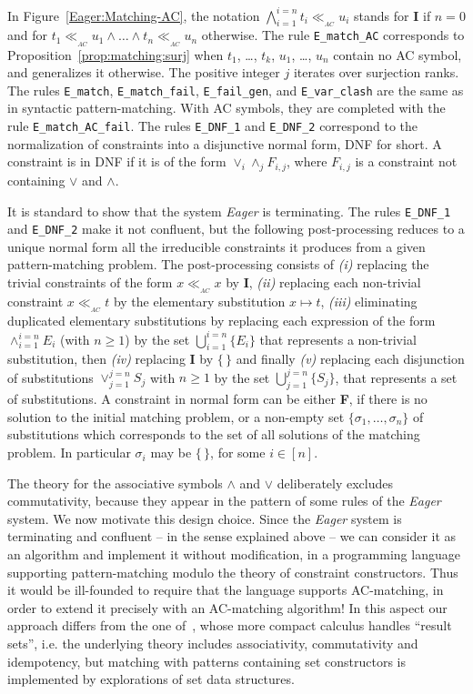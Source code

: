 \documentclass[submission,copyright,creativecommons]{eptcs}
\newcommand \matchth[3]{#1 {\ll}_{{ }_{#3}} {#2}}
\newcommand \matchAC[2]{\matchth{#1}{#2}{AC}}
\newcommand \set[1]{\{#1\}}
\numberwithin{subcase}{case}
\begin{document}
In Figure~\ref{Eager:Matching-AC}, the notation $\bigwedge_{i=1}^{i=n}
\matchAC{t_i}{u_i}$ stands for \textbf{I} if $n = 0$ and for $\matchAC{t_1}{u_1}
\land \ldots \land \matchAC{t_n}{u_n}$ otherwise. The rule \texttt{E\_match\_AC}
corresponds to Proposition~\ref{prop:matching:surj} when $t_1$, \ldots, $t_k$,
$u_1$, \ldots, $u_n$ contain no AC symbol, and generalizes it otherwise.  The
positive integer $j$ iterates over surjection ranks. The rules \texttt{E\_match},
\texttt{E\_match\_fail}, \texttt{E\_fail\_gen}, and \texttt{E\_var\_clash} are
the same as in syntactic pattern-matching. With AC symbols, they are completed
with the rule \texttt{E\_match\_AC\_fail}. The rules \texttt{E\_DNF\_1} and
\texttt{E\_DNF\_2} correspond to the normalization of constraints into a
disjunctive normal form, DNF for short. A constraint is in DNF if it is of
the form $\lor_{i}\land_j F_{i,j}$, where $F_{i,j}$ is a constraint not
containing $\lor$ and $\land$.


It is standard to show that the system \textit{Eager} is terminating. The rules
\texttt{E\_DNF\_1} and \texttt{E\_DNF\_2} make it not confluent, but the
following post-processing reduces to a unique normal form all the irreducible
constraints it produces from a given pattern-matching problem. The
post-processing consists of \emph{(i)} replacing the trivial constraints of the
form $\matchAC{x}{x}$ by \textbf{I}, \emph{(ii)} replacing each non-trivial
constraint $\matchAC{x}{t}$ by the elementary substitution
 $x\mapsto t$, \emph{(iii)} eliminating duplicated elementary substitutions by
 replacing each expression of the form $\land_{i=1}^{i=n} E_i$ (with $n \ge 1$)
 by the set $\bigcup_{i=1}^{i=n} \{E_i\}$ that represents a
non-trivial substitution, then \emph{(iv)} replacing $\textbf{I}$ by $\{\,\}$
and finally \emph{(v)} replacing each disjunction  of
substitutions $\lor_{j=1}^{j=n} S_j$ with $n \ge 1$ by the set
$\bigcup_{j=1}^{j=n} \{S_j\}$, that represents a set of substitutions. A constraint in normal form can be either
\textbf{F}, if there is no solution to the initial matching problem, or a
non-empty set $\set{\sigma_1,\ldots,\sigma_n}$ of substitutions  which
corresponds to the set of all solutions of the matching problem. In particular
$\sigma_i$ may be $\{\,\}$, for some $i\in [n]$.


The theory for the associative symbols $\land$ and $\lor$ deliberately excludes
commutativity, because they appear in the pattern of some rules of the
\textit{Eager} system. We now motivate  this design choice. 
Since the \textit{Eager} system  is terminating and confluent 
-- in the sense explained above -- we can consider
it  as an algorithm and implement it without
modification, in a programming language supporting pattern-matching modulo the
theory of constraint constructors. Thus it would be ill-founded to require that
the language supports AC-matching, in order to extend it precisely with an
AC-matching algorithm! In this aspect our approach differs from the one
of~\cite{rhoCalIGLP-I+II-2001}, whose more compact calculus handles ``result
sets'', i.e. the underlying theory includes associativity, commutativity and
idempotency, but matching with patterns
containing set constructors is implemented by explorations of set data
structures.
 
\end{document}
